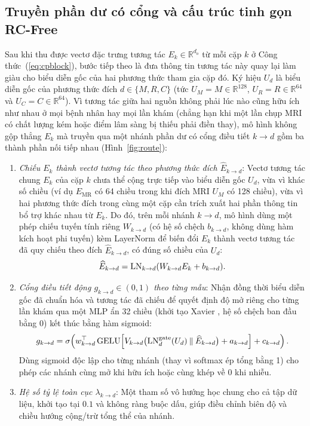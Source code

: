 \subsection{Truyền phần dư có cổng và cấu trúc tinh gọn RC-Free}
\label{sec:gated-routing}
\label{sec:rcfree-method}
Sau khi thu được vectơ đặc trưng tương tác $E_k\in\mathbb R^{d_o}$ từ mỗi cặp $k$ ở Công thức~(\ref{eq:cpblock}), bước tiếp theo là đưa thông tin tương tác này quay lại làm giàu cho biểu diễn gốc của hai phương thức tham gia cặp đó. Ký hiệu $U_d$ là biểu diễn gốc của phương thức đích $d\in\{M,R,C\}$ (tức $U_M=M\in\mathbb R^{128}$, $U_R=R\in\mathbb R^{64}$ và $U_C=C\in\mathbb R^{64}$). Vì tương tác giữa hai nguồn không phải lúc nào cũng hữu ích như nhau ở mọi bệnh nhân hay mọi lần khám (chẳng hạn khi một lần chụp MRI có chất lượng kém hoặc điểm lâm sàng bị thiếu phải điền thay), mô hình không gộp thẳng $E_k$ mà truyền qua một nhánh phần dư có cổng điều tiết $k\to d$ gồm ba thành phần nối tiếp nhau (Hình~\ref{fig:route}):
\begin{enumerate}
\item \emph{Chiếu $E_k$ thành vectơ tương tác theo phương thức đích $\widehat E_{k\to d}$}: Vectơ tương tác chung $E_k$ của cặp $k$ chưa thể cộng trực tiếp vào biểu diễn gốc $U_d$, vừa vì khác số chiều (ví dụ $E_{\mathrm{MR}}$ có 64 chiều trong khi đích MRI $U_M$ có 128 chiều), vừa vì hai phương thức đích trong cùng một cặp cần trích xuất hai phần thông tin bổ trợ khác nhau từ $E_k$. Do đó, trên mỗi nhánh $k\to d$, mô hình dùng một phép chiếu tuyến tính riêng $W_{k\to d}$ (có hệ số chệch $b_{k\to d}$, không dùng hàm kích hoạt phi tuyến) kèm LayerNorm để biến đổi $E_k$ thành vectơ tương tác đã quy chiếu theo đích $\widehat E_{k\to d}$, có đúng số chiều của $U_d$:
\begin{equation}
 \widehat E_{k\to d}=\operatorname{LN}_{k\to d}(W_{k\to d}E_k+b_{k\to d}).
 \label{eq:target-projection}
\end{equation}
\item \emph{Cổng điều tiết động $g_{k\to d}\in(0,1)$ theo từng mẫu}: Nhận đồng thời biểu diễn gốc đã chuẩn hóa và tương tác đã chiếu để quyết định độ mở riêng cho từng lần khám qua một MLP ẩn 32 chiều (khởi tạo Xavier \cite{glorot2010understanding}, hệ số chệch ban đầu bằng 0) kết thúc bằng hàm sigmoid:
\begin{equation}
 g_{k\to d}=\sigma\!\left(
 w_{k\to d}^{\top}\operatorname{GELU}\!\left[
 V_{k\to d}\bigl(\operatorname{LN}_d^{\rm gate}(U_d)\mathbin{\|}\widehat E_{k\to d}\bigr)
 +a_{k\to d}\right]+c_{k\to d}\right).
 \label{eq:dynamic-gate}
\end{equation}
Dùng sigmoid độc lập cho từng nhánh (thay vì softmax ép tổng bằng 1) cho phép các nhánh cùng mở khi hữu ích hoặc cùng khép về 0 khi nhiễu.
\item \emph{Hệ số tỷ lệ toàn cục $\lambda_{k\to d}$}: Một tham số vô hướng học chung cho cả tập dữ liệu, khởi tạo tại $0.1$ và không ràng buộc dấu, giúp điều chỉnh biên độ và chiều hướng cộng/trừ tổng thể của nhánh.
\end{enumerate}

